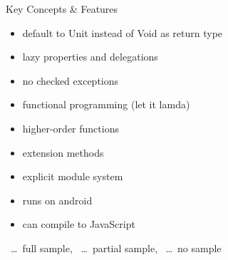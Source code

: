 \begin{frame}{Key Concepts \& Features}
	\begin{itemize}
		\item default to Unit instead of Void as return type \xmark 
		\item lazy properties and delegations \cmark
		\item no checked exceptions \xmark
		\item functional programming (let it lamda) \tmark
		\item higher-order functions \tmark
		\item extension methods \cmark
		\item explicit module system \xmark
		\item runs on android \xmark
		\item can compile to JavaScript \xmark
	\end{itemize}
\cmark\ \dots\ full sample, \tmark\ \dots\ partial sample, \xmark\ \dots\ no sample
\end{frame}

